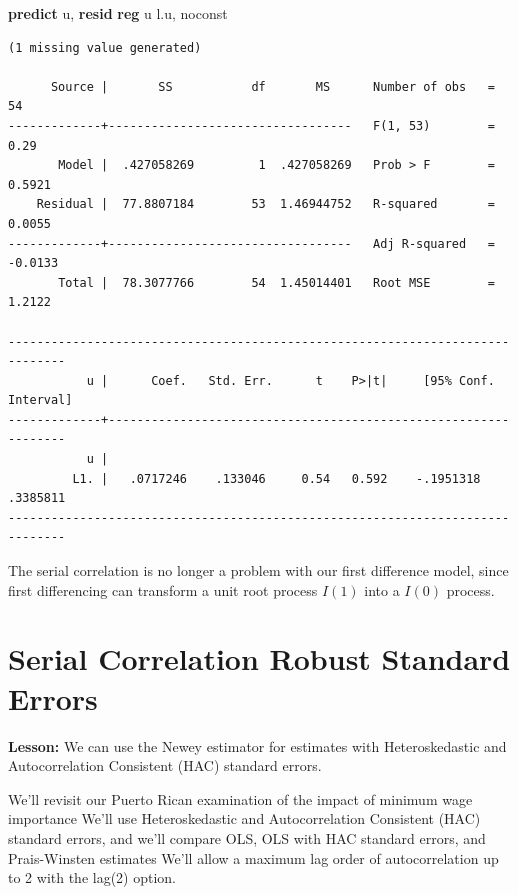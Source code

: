 \documentclass[
]{book}
\newenvironment{Shaded}{\begin{snugshade}}{\end{snugshade}}
\newcommand{\KeywordTok}[1]{\textcolor[rgb]{0.13,0.29,0.53}{\textbf{#1}}}
\newcommand{\NormalTok}[1]{#1}
\newcommand{\OtherTok}[1]{\textcolor[rgb]{0.56,0.35,0.01}{#1}}
\begin{document}
\begin{Shaded}
\begin{Highlighting}[]
\KeywordTok{predict}\NormalTok{ u, }\KeywordTok{resid}
\KeywordTok{reg}\NormalTok{ u }\OtherTok{l}\NormalTok{.u, noconst}
\end{Highlighting}
\end{Shaded}

\begin{verbatim}
(1 missing value generated)

      Source |       SS           df       MS      Number of obs   =        54
-------------+----------------------------------   F(1, 53)        =      0.29
       Model |  .427058269         1  .427058269   Prob > F        =    0.5921
    Residual |  77.8807184        53  1.46944752   R-squared       =    0.0055
-------------+----------------------------------   Adj R-squared   =   -0.0133
       Total |  78.3077766        54  1.45014401   Root MSE        =    1.2122

------------------------------------------------------------------------------
           u |      Coef.   Std. Err.      t    P>|t|     [95% Conf. Interval]
-------------+----------------------------------------------------------------
           u |
         L1. |   .0717246    .133046     0.54   0.592    -.1951318    .3385811
------------------------------------------------------------------------------
\end{verbatim}

The serial correlation is no longer a problem with our first difference model,
since first differencing can transform a unit root process \(I(1)\) into a \(I(0)\) process.

\section{Serial Correlation Robust Standard Errors}\label{serial-correlation-robust-standard-errors}

\textbf{Lesson:} We can use the Newey estimator for estimates
with Heteroskedastic and Autocorrelation Consistent (HAC) standard errors.

We'll revisit our Puerto Rican examination of the impact of minimum wage importance
We'll use Heteroskedastic and Autocorrelation Consistent (HAC) standard errors, and
we'll compare OLS, OLS with HAC standard errors, and Prais-Winsten estimates
We'll allow a maximum lag order of autocorrelation up to 2 with the lag(2) option.
\end{document}
